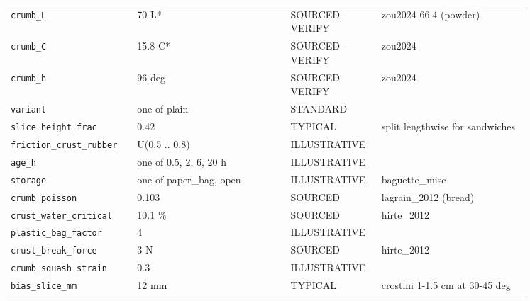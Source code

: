 \documentclass[10.5pt,a4paper]{article}
\begin{document}
{\begin{longtable}{@{}p{0.2\linewidth}p{0.27\linewidth}p{0.12\linewidth}p{0.26\linewidth}@{}}
\texttt{crumb\_\allowbreak{}L} & 70 L* & SOURCED-VERIFY & zou2024 66.4 (powder) \\
\texttt{crumb\_\allowbreak{}C} & 15.8 C* & SOURCED-VERIFY & zou2024 \\
\texttt{crumb\_\allowbreak{}h} & 96 deg & SOURCED-VERIFY & zou2024 \\
\texttt{variant} & one of plain & STANDARD &  \\
\texttt{slice\_\allowbreak{}height\_\allowbreak{}frac} & 0.42 & TYPICAL & split lengthwise for sandwiches \\
\texttt{friction\_\allowbreak{}crust\_\allowbreak{}rubber} & U(0.5 .. 0.8) & ILLUSTRATIVE &  \\
\texttt{age\_\allowbreak{}h} & one of 0.5, 2, 6, 20 h & ILLUSTRATIVE &  \\
\texttt{storage} & one of paper\_bag, open & ILLUSTRATIVE & baguette\_misc \\
\texttt{crumb\_\allowbreak{}poisson} & 0.103 & SOURCED & lagrain\_2012 (bread) \\
\texttt{crust\_\allowbreak{}water\_\allowbreak{}critical} & 10.1 \% & SOURCED & hirte\_2012 \\
\texttt{plastic\_\allowbreak{}bag\_\allowbreak{}factor} & 4 & ILLUSTRATIVE &  \\
\texttt{crust\_\allowbreak{}break\_\allowbreak{}force} & 3 N & SOURCED & hirte\_2012 \\
\texttt{crumb\_\allowbreak{}squash\_\allowbreak{}strain} & 0.3 & ILLUSTRATIVE &  \\
\texttt{bias\_\allowbreak{}slice\_\allowbreak{}mm} & 12 mm & TYPICAL & crostini 1-1.5 cm at 30-45 deg \\\bottomrule\end{longtable}}
\end{document}
